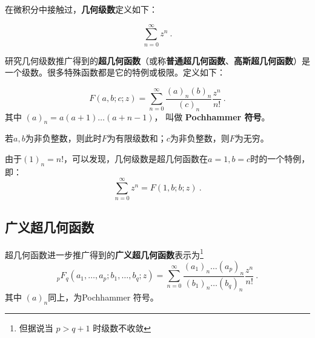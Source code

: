 

在微积分中接触过，\textbf{几何级数}定义如下：

\begin{equation}
\sum_{n=0}^\infty z^n~.
\end{equation}

研究几何级数推广得到的\textbf{超几何函数}（或称\textbf{普通超几何函数}、\textbf{高斯超几何函数}）是一个级数。很多特殊函数都是它的特例或极限。定义如下：

\begin{equation}
F(a,b;c;z) = \sum_{n=0}^\infty \frac{(a)_n(b)_n}{(c)_n} \frac{z^n}{n!}~.
\end{equation}
其中 $(a)_n = a(a+1)\dots(a+n-1)$， 叫做 \textbf{Pochhammer 符号}。

若$a,b$为非负整数，则此时$F$为有限级数和；$c$为非负整数，则$F$为无穷。

由于$(1)_n=n!$，可以发现，几何级数是超几何函数在$a=1,b=c$时的一个特例，即：
\begin{equation}
\sum_{n=0}^\infty z^n=F(1,b;b;z)~.
\end{equation}

\subsection{广义超几何函数}

超几何函数进一步推广得到的\textbf{广义超几何函数}表示为\footnote{但据说当 $p > q+1$ 时级数不收敛}
\begin{equation}
{_pF_q}(a_1,\dots, a_p; b_1, \dots, b_q; z) = \sum_{n=0}^\infty \frac{(a_1)_n\dots (a_p)_n}{(b_1)_n\dots(b_q)_n} \frac{z^n}{n!}~.
\end{equation}
其中 $(a)_n$同上，为Pochhammer 符号。


